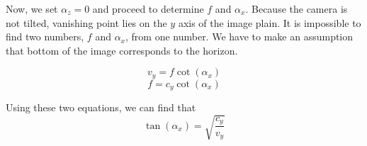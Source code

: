 \documentclass{article}
\begin{document}
Now, we set $\alpha_z = 0$ and proceed to determine $f$ and $\alpha_x$.
Because the camera is not tilted, vanishing point lies on the $y$ axis of the image plain.
It is impossible to find two numbers, $f$ and $\alpha_x$, from one number.
We have to make an assumption that bottom of the image corresponds to the horizon.


\begin{equation}
v_y = f \cot(\alpha_x)
\end{equation}
\begin{equation}
f = c_y \cot(\alpha_x)
\end{equation}

Using these two equations, we can find that
\begin{equation}
\tan(\alpha_x) = \sqrt{\frac{c_y}{v_y}}
\end{equation}



\end{document}
